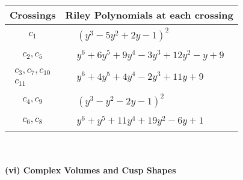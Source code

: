 \documentclass[1p]{elsarticle_modified}
\theoremstyle{definition}
\begin{document}
\begin{tabular}{m{50pt}|m{274pt}}
Crossings & \hspace{64pt}Riley Polynomials at each crossing \\
\hline $$\begin{aligned}c_{1}\end{aligned}$$&$\begin{aligned}
&(y^3-5 y^2+2 y-1)^2
\end{aligned}$\\
\hline $$\begin{aligned}c_{2},c_{5}\end{aligned}$$&$\begin{aligned}
&y^6+6 y^5+9 y^4-3 y^3+12 y^2- y+9
\end{aligned}$\\
\hline $$\begin{aligned}c_{3},c_{7},c_{10}\\c_{11}\end{aligned}$$&$\begin{aligned}
&y^6+4 y^5+4 y^4-2 y^3+11 y+9
\end{aligned}$\\
\hline $$\begin{aligned}c_{4},c_{9}\end{aligned}$$&$\begin{aligned}
&(y^3- y^2-2 y-1)^2
\end{aligned}$\\
\hline $$\begin{aligned}c_{6},c_{8}\end{aligned}$$&$\begin{aligned}
&y^6+y^5+11 y^4+19 y^2-6 y+1
\end{aligned}$\\
\hline
\end{tabular}\\~\\
\newpage\flushleft \textbf{(vi) Complex Volumes and Cusp Shapes}
\end{document}
